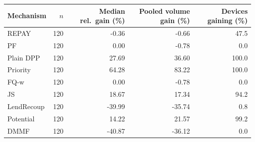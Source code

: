 \begin{tabular}{lrrrr}
\toprule
Mechanism & $n$ & Median rel.\ gain (\%) & Pooled volume gain (\%) & Devices gaining (\%) \\
\midrule
REPAY & 120 & -0.36 & -0.66 & 47.5 \\
PF & 120 & 0.00 & -0.78 & 0.0 \\
Plain DPP & 120 & 27.69 & 36.60 & 100.0 \\
Priority & 120 & 64.28 & 83.22 & 100.0 \\
\midrule
FQ-w & 120 & 0.00 & -0.78 & 0.0 \\
JS & 120 & 18.67 & 17.34 & 94.2 \\
LendRecoup & 120 & -39.99 & -35.74 & 0.8 \\
Potential & 120 & 14.22 & 21.57 & 99.2 \\
DMMF & 120 & -40.87 & -36.12 & 0.0 \\
\bottomrule
\end{tabular}
